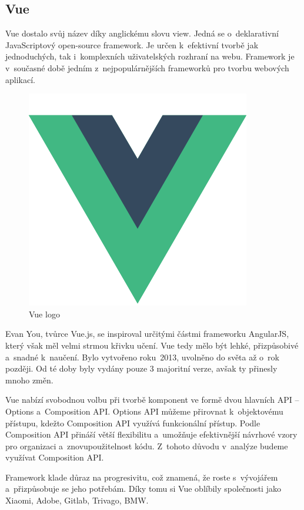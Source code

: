 \subsection{Vue}


Vue dostalo svůj název díky anglickému slovu view. Jedná se o~deklarativní JavaScriptový open-source framework. 
Je určen k~efektivní tvorbě jak jednoduchých, tak i~komplexních uživatelských rozhraní na webu. 
Framework je v~současné době jedním z~nejpopulárnějších frameworků pro tvorbu webových aplikací.\cite{vuemacrae,vue}

\begin{figure}[htb]
	\centering
		\includegraphics[width=.23\textwidth]{images/vue-logo.png}
	\caption[Vue logo]{Vue logo \cite{vue}}
	\label{fig:vuelogo}
\end{figure}

Evan You, tvůrce Vue.js, se inspiroval určitými částmi frameworku AngularJS, který však měl velmi strmou křivku učení. 
Vue tedy mělo být lehké, přizpůsobivé a~snadné k~naučení. Bylo vytvořeno roku~2013, uvolněno do světa až o~rok později. 
Od té doby byly vydány pouze 3 majoritní verze, avšak ty přinesly mnoho změn.\cite{vueflexiple,vuemedium}

Vue nabízí svobodnou volbu při tvorbě komponent ve formě dvou hlavních API -- Options a~Composition API. 
Options API můžeme přirovnat k~objektovému přístupu, kdežto Composition API využívá funkcionální přístup. 
Podle \cite{vue} Composition API přináší větší flexibilitu a~umožňuje efektivnější návrhové vzory pro organizaci a~znovupoužitelnost kódu. 
Z~tohoto důvodu v~analýze budeme využívat Composition API.

Framework klade důraz na progresivitu, což znamená, že roste s~vývojářem a~přizpůsobuje se jeho potřebám. 
Díky tomu si Vue oblíbily společnosti jako Xiaomi, Adobe, Gitlab, Trivago, BMW.\cite{vuetriodev,vue}

